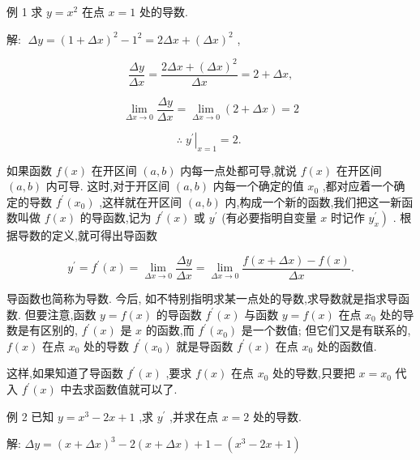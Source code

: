 \documentclass[10pt]{article}
\begin{document}
例 1 求 \(y = {x}^{2}\) 在点 \(x = 1\) 处的导数.

解: \(\;{\Delta y} = {\left( 1 + \Delta x\right) }^{2} - {1}^{2} = {2\Delta x} + {\left( \Delta x\right) }^{2}\) ,

\[
\frac{\Delta y}{\Delta x} = \frac{{2\Delta x} + {\left( \Delta x\right) }^{2}}{\Delta x} = 2 + {\Delta x},
\]

\[
\mathop{\lim }\limits_{{{\Delta x} \rightarrow 0}}\frac{\Delta y}{\Delta x} = \mathop{\lim }\limits_{{{\Delta x} \rightarrow 0}}\left( {2 + {\Delta x}}\right) = 2
\]

\[
\therefore {\left. \;{y}^{\prime }\right| }_{x = 1} = 2\text{. }
\]

如果函数 \(f\left( x\right)\) 在开区间 \(\left( {a,b}\right)\) 内每一点处都可导,就说 \(f\left( x\right)\) 在开区间 \(\left( {a,b}\right)\) 内可导. 这时,对于开区间 \(\left( {a,b}\right)\) 内每一个确定的值 \({x}_{0}\) ,都对应着一个确定的导数 \({f}^{\prime }\left( {x}_{0}\right)\) ,这样就在开区间 \(\left( {a,b}\right)\) 内,构成一个新的函数,我们把这一新函数叫做 \(f\left( x\right)\) 的导函数,记为 \({f}^{\prime }\left( x\right)\) 或 \({y}^{\prime }\) (有必要指明自变量 \(x\) 时记作 \(\left. {y}_{x}^{\prime }\right)\) . 根据导数的定义,就可得出导函数

\[
{y}^{\prime } = {f}^{\prime }\left( x\right) = \mathop{\lim }\limits_{{{\Delta x} \rightarrow 0}}\frac{\Delta y}{\Delta x} = \mathop{\lim }\limits_{{{\Delta x} \rightarrow 0}}\frac{f\left( {x + {\Delta x}}\right) - f\left( x\right) }{\Delta x}. \tag{2}
\]

导函数也简称为导数. 今后, 如不特别指明求某一点处的导数,求导数就是指求导函数. 但要注意,函数 \(y = f\left( x\right)\) 的导函数 \({f}^{\prime }\left( x\right)\) 与函数 \(y = f\left( x\right)\) 在点 \({x}_{0}\) 处的导数是有区别的, \({f}^{\prime }\left( x\right)\) 是 \(x\) 的函数,而 \({f}^{\prime }\left( {x}_{0}\right)\) 是一个数值; 但它们又是有联系的, \(f\left( x\right)\) 在点 \({x}_{0}\) 处的导数 \({f}^{\prime }\left( {x}_{0}\right)\) 就是导函数 \({f}^{\prime }\left( x\right)\) 在点 \({x}_{0}\) 处的函数值.

这样,如果知道了导函数 \({f}^{\prime }\left( x\right)\) ,要求 \(f\left( x\right)\) 在点 \({x}_{0}\) 处的导数,只要把 \(x = {x}_{0}\) 代入 \({f}^{\prime }\left( x\right)\) 中去求函数值就可以了.

例 2 已知 \(y = {x}^{3} - {2x} + 1\) ,求 \({y}^{\prime }\) ,并求在点 \(x = 2\) 处的导数.

解: \({\Delta y} = {\left( x + \Delta x\right) }^{3} - 2\left( {x + {\Delta x}}\right) + 1 - \left( {{x}^{3} - {2x} + 1}\right)\)
\end{document}
